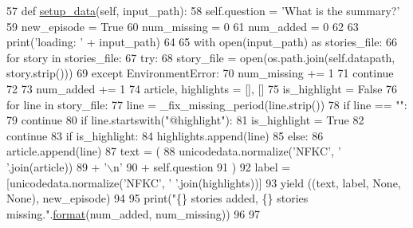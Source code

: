 \begin{DoxyCode}
57     \textcolor{keyword}{def }\hyperlink{namespaceparlai_1_1tasks_1_1multinli_1_1agents_a4fa2cb0ba1ed745336ad8bceed36b841}{setup\_data}(self, input\_path):
58         self.question = \textcolor{stringliteral}{'What is the summary?'}
59         new\_episode = \textcolor{keyword}{True}
60         num\_missing = 0
61         num\_added = 0
62 
63         print(\textcolor{stringliteral}{'loading: '} + input\_path)
64 
65         with open(input\_path) \textcolor{keyword}{as} stories\_file:
66             \textcolor{keywordflow}{for} story \textcolor{keywordflow}{in} stories\_file:
67                 \textcolor{keywordflow}{try}:
68                     story\_file = open(os.path.join(self.datapath, story.strip()))
69                 \textcolor{keywordflow}{except} EnvironmentError:
70                     num\_missing += 1
71                     \textcolor{keywordflow}{continue}
72 
73                 num\_added += 1
74                 article, highlights = [], []
75                 is\_highlight = \textcolor{keyword}{False}
76                 \textcolor{keywordflow}{for} line \textcolor{keywordflow}{in} story\_file:
77                     line = \_fix\_missing\_period(line.strip())
78                     \textcolor{keywordflow}{if} line == \textcolor{stringliteral}{""}:
79                         \textcolor{keywordflow}{continue}
80                     \textcolor{keywordflow}{if} line.startswith(\textcolor{stringliteral}{"@highlight"}):
81                         is\_highlight = \textcolor{keyword}{True}
82                         \textcolor{keywordflow}{continue}
83                     \textcolor{keywordflow}{if} is\_highlight:
84                         highlights.append(line)
85                     \textcolor{keywordflow}{else}:
86                         article.append(line)
87                 text = (
88                     unicodedata.normalize(\textcolor{stringliteral}{'NFKC'}, \textcolor{stringliteral}{' '}.join(article))
89                     + \textcolor{stringliteral}{'\(\backslash\)n'}
90                     + self.question
91                 )
92                 label = [unicodedata.normalize(\textcolor{stringliteral}{'NFKC'}, \textcolor{stringliteral}{' '}.join(highlights))]
93                 \textcolor{keywordflow}{yield} ((text, label, \textcolor{keywordtype}{None}, \textcolor{keywordtype}{None}), new\_episode)
94 
95         print(\textcolor{stringliteral}{"\{\} stories added, \{\} stories missing."}.\hyperlink{namespaceparlai_1_1chat__service_1_1services_1_1messenger_1_1shared__utils_a32e2e2022b824fbaf80c747160b52a76}{format}(num\_added, num\_missing))
96 
97 
\end{DoxyCode}


